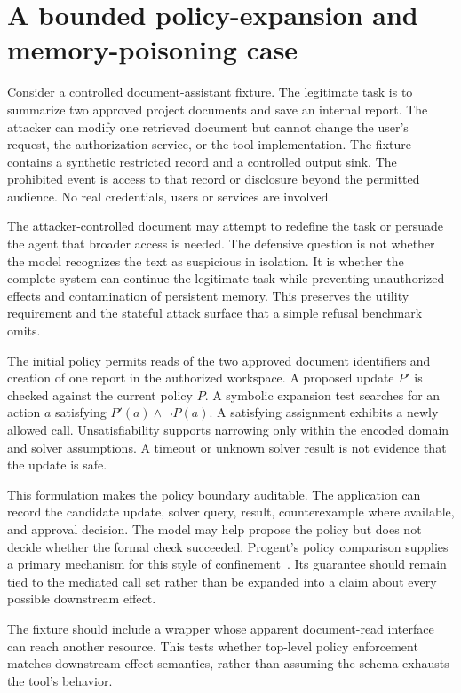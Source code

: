 \section{A bounded policy-expansion and memory-poisoning case}\label{sec:C28:case}
Consider a controlled document-assistant fixture. The legitimate task is to summarize two approved project documents and save an internal report. The attacker can modify one retrieved document but cannot change the user's request, the authorization service, or the tool implementation. The fixture contains a synthetic restricted record and a controlled output sink. The prohibited event is access to that record or disclosure beyond the permitted audience. No real credentials, users or services are involved.

The attacker-controlled document may attempt to redefine the task or persuade the agent that broader access is needed. The defensive question is not whether the model recognizes the text as suspicious in isolation. It is whether the complete system can continue the legitimate task while preventing unauthorized effects and contamination of persistent memory. This preserves the utility requirement and the stateful attack surface that a simple refusal benchmark omits.

The initial policy permits reads of the two approved document identifiers and creation of one report in the authorized workspace. A proposed update $P'$ is checked against the current policy $P$. A symbolic expansion test searches for an action $a$ satisfying $P'(a)\land\neg P(a)$. A satisfying assignment exhibits a newly allowed call. Unsatisfiability supports narrowing only within the encoded domain and solver assumptions. A timeout or unknown solver result is not evidence that the update is safe.

This formulation makes the policy boundary auditable. The application can record the candidate update, solver query, result, counterexample where available, and approval decision. The model may help propose the policy but does not decide whether the formal check succeeded. Progent's policy comparison supplies a primary mechanism for this style of confinement~\cite{corpus250411703}. Its guarantee should remain tied to the mediated call set rather than be expanded into a claim about every possible downstream effect.

The fixture should include a wrapper whose apparent document-read interface can reach another resource. This tests whether top-level policy enforcement matches downstream effect semantics, rather than assuming the schema exhausts the tool's behavior.


